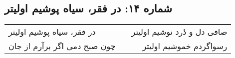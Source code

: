 \begin{center}
\section*{شماره ۱۴: در فقر، سیاه پوشیم اولیتر}
\label{sec:014}
\begin{longtable}{l p{0.5cm} r}
در فقر، سیاه پوشیم اولیتر
&&
صافی دل و دُرد نوشیم اولیتر
\\
چون صبح دمی اگر برآرم از جان
&&
رسواگردم خموشیم اولیتر
\\
\end{longtable}
\end{center}

